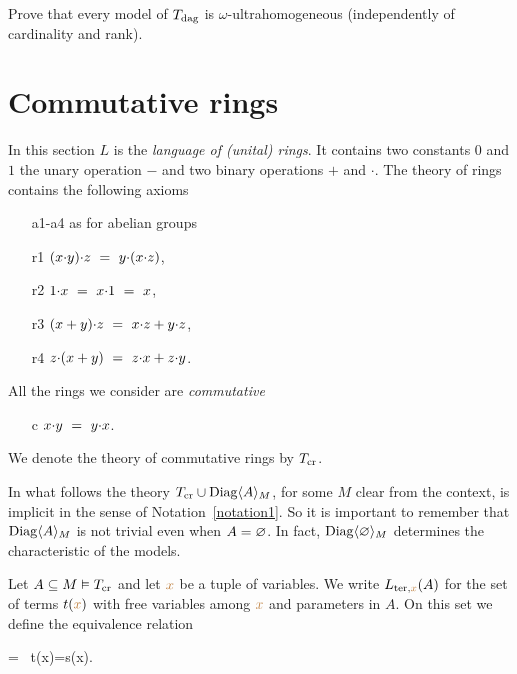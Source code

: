 \begin{exercise}
Prove that every model of $T_{\rm dag}$ is $\omega$-ultrahomogeneous (independently of cardinality and rank).
\end{exercise}

\section{Commutative rings}
\label{anelli}

In this section $L$ is the \emph{language of (unital) rings}.
%
It contains two constants $0$ and $1$ the unary operation $-$ and two binary operations $+$ and $\cdot$.
%
The theory of rings contains the following axioms

\begin{itemize}
\item[a1-a4] as for abelian groups
\item[r1] $(x\mdot y)\mdot z\  =\ y\mdot(x\mdot z)$,
\item[r2] $1\mdot x\ =\ x\mdot 1\ =\ x$,
\item[r3] $(x+y)\mdot z\ =\ x\mdot z + y\mdot z$,
\item[r4] $z\mdot (x+y)\ =\ z\mdot x + z\mdot y$.
\end{itemize}

All the rings we consider are \emph{commutative\/} 

\begin{itemize}
\item[c] $x\mdot y\ =\ y\mdot x$.
\end{itemize}
 
We denote the theory of commutative rings by \emph{$T_{\rm cr}$}.

In what follows the theory $T_{\rm cr}\cup\Diag\<A\>_M$, for some $M$ clear from the context, is implicit in the sense of Notation~\ref{notation1}.
%
So it is important to remember that $\Diag\<A\>_M$ is not trivial even when $A=\0$.
%
In fact, $\Diag\<\0\>_M$ determines the characteristic of the models.

Let  $A\subseteq M\models T_{\rm cr}$ and let ${\mr x}$ be a tuple of variables.
%
We write $L_{{\rm ter},{\mr x}}(A)$ for the set of terms $t({\mr x})$ with free variables among ${\mr x}$ and parameters in $A$.
%
On this set we define the equivalence relation

%
{=}%
{\proves \ t({\mr x})=s({\mr x}).}

